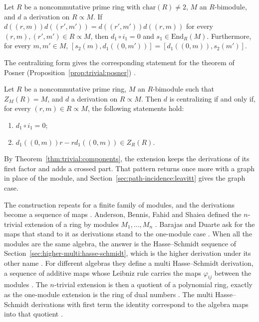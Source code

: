 \begin{theorem}\label{thm:trivial:herstein}
Let $R$ be a noncommutative prime ring with $\mathrm{char}(R)\neq 2$, $M$ an
$R$-bimodule, and $d$ a derivation on $R\propto M$. If
$d((r,m))d((r',m'))=d((r',m'))d((r,m))$ for every $(r,m),(r',m')\in R\propto M$,
then $d_{1}\circ i_{1}=0$ and $s_{1}\in\mathrm{End}_{R}(M)$. Furthermore, for every
$m,m'\in M$, $[s_{2}(m),d_{1}((0,m'))]=[d_{1}((0,m)),s_{2}(m')]$.
\end{theorem}

The centralizing form gives the corresponding statement for the theorem of Posner (Proposition~\ref{prop:trivial:posner})
\cite[p.~468]{BoudineZerra2024}.\begin{proposition}\label{prop:trivial:posner}
Let $R$ be a noncommutative prime ring, $M$ an $R$-bimodule such that
$Z_{M}(R)=M$, and $d$ a derivation on $R\propto M$. Then $d$ is centralizing if and
only if, for every $(r,m)\in R\propto M$, the following statements hold:
\begin{enumerate}[label=(\arabic*)]
\item $d_{1}\circ i_{1}=0$;
\item $d_{1}((0,m))r-rd_{1}((0,m))\in Z_{R}(R)$.
\end{enumerate}
\end{proposition}

By Theorem~\ref{thm:trivial:components}, the extension keeps the derivations of its
first factor and adds a crossed part. That pattern returns once more with a graph in
place of the module, and Section~\ref{sec:path-incidence:leavitt} gives the graph
case.

The construction repeats for a finite family of modules, and the derivations
become a sequence of maps \cite[p.~2]{BarajasDuarte2026}. Anderson, Bennis,
Fahid and Shaiea defined the $n$-trivial extension of a ring by modules
$M_1,\dots,M_n$ \cite[p.~2]{BarajasDuarte2026}. Barajas and Duarte ask for the
maps that stand to it as derivations stand to the one-module case
\cite[p.~2]{BarajasDuarte2026}. When all the modules are the same algebra, the
answer is the Hasse--Schmidt sequence of
Section~\ref{sec:higher-multi:hasse-schmidt}, which is the higher derivation
under its other name \cite[p.~2]{BarajasDuarte2026}.
For different algebras they define a multi Hasse--Schmidt derivation, a sequence
of additive maps whose Leibniz rule carries the maps $\varphi_{ij}$ between the
modules \cite[Definition~3.1, p.~6]{BarajasDuarte2026}. The $n$-trivial
extension is then a quotient of a polynomial ring, exactly as the one-module
extension is the ring of dual numbers \cite[Theorem~4.2, p.~13]{BarajasDuarte2026}.
The multi Hasse--Schmidt derivations with first term the identity correspond to
the algebra maps into that quotient \cite[Corollary~4.3, p.~15]{BarajasDuarte2026}.

